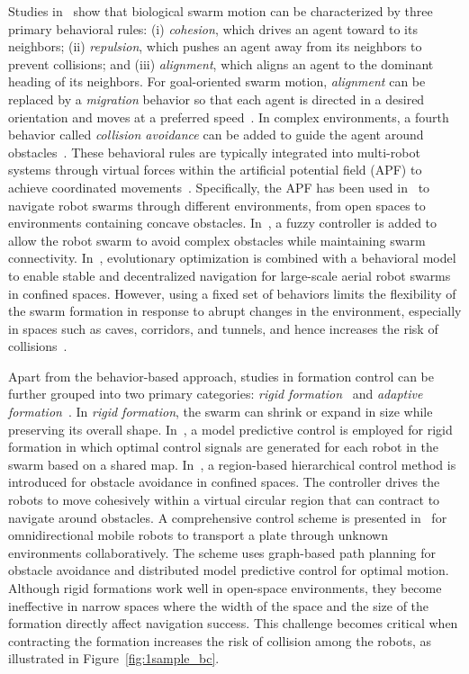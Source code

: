 Studies in~\cite{736776,Reynolds1987,Antonelli2009} show that biological swarm motion can be characterized by three primary behavioral rules: (i) \textit{cohesion}, which drives an agent toward to its neighbors; (ii) \textit{repulsion}, which pushes an agent away from its neighbors to prevent collisions; and (iii) \textit{alignment}, which aligns an agent to the dominant heading of its neighbors. For goal-oriented swarm motion, \textit{alignment} can be replaced by a \textit{migration} behavior so that each agent is directed in a desired orientation and moves at a preferred speed~\cite{6095129}. In complex environments, a fourth behavior called \textit{collision avoidance} can be added to guide the agent around obstacles~\cite{9565893, 9990164,1605401,10417519}. These behavioral rules are typically integrated into multi-robot systems through virtual forces within the artificial potential field (APF) to achieve coordinated movements~\cite{9981858,9561902,9990164}. Specifically, the APF has been used in~\cite{10417519,8716301,9565893} to navigate robot swarms through different environments, from open spaces to environments containing concave obstacles. In~\cite{9565893}, a fuzzy controller is added to allow the robot swarm to avoid complex obstacles while maintaining swarm connectivity. In~\cite{Vsrhelyi2018}, evolutionary optimization is combined with a behavioral model to enable stable and decentralized navigation for large-scale aerial robot swarms in confined spaces. However, using a fixed set of behaviors limits the flexibility of the swarm formation in response to abrupt changes in the environment, especially in spaces such as caves, corridors, and tunnels, and hence increases the risk of collisions~\cite{Saska2020,AlonsoMora2017}.

Apart from the behavior-based approach, studies in formation control can be further grouped into two primary categories: \textit{rigid formation}~\cite{Saska2020,Gmez2013,Roy2018,Ebel2017} and \textit{adaptive formation}~\cite{Fu2020,8843165,AlonsoMora2017,AlonsoMora2018}. In \textit{rigid formation}, the swarm can shrink or expand in size while preserving its overall shape. In~\cite{Saska2020}, a model predictive control is employed for rigid formation in which optimal control signals are generated for each robot in the swarm based on a shared map. In~\cite{Roy2018}, a region-based hierarchical control method is introduced for obstacle avoidance in confined spaces. The controller drives the robots to move cohesively within a virtual circular region that can contract to navigate around obstacles. A comprehensive control scheme is presented in~\cite{Ebel2017} for omnidirectional mobile robots to transport a plate through unknown environments collaboratively. The scheme uses graph-based path planning for obstacle avoidance and distributed model predictive control for optimal motion. Although rigid formations work well in open-space environments, they become ineffective in narrow spaces where the width of the space and the size of the formation directly affect navigation success. This challenge becomes critical when contracting the formation increases the risk of collision among the robots, as illustrated in Figure~\ref{fig:1sample_bc}.

